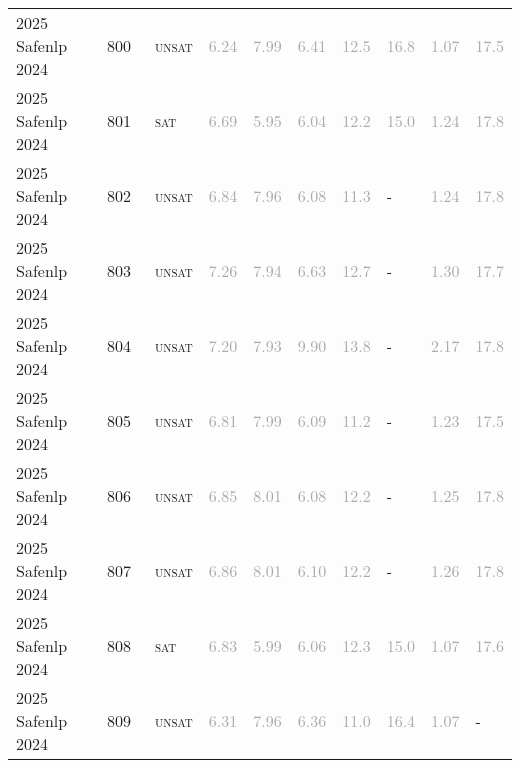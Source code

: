 \begin{center}
{\begin{longtable}{@{}llllllllll@{}}
2025 Safenlp 2024 & 800 & ~\textsc{unsat} & \textcolor{darkgray}{6.24} & \textcolor{darkgray}{7.99} & \textcolor{darkgray}{6.41} & \textcolor{darkgray}{12.5} & \textcolor{darkgray}{16.8} & \textcolor{darkgray}{1.07} & \textcolor{darkgray}{17.5} \\
2025 Safenlp 2024 & 801 & ~\textsc{sat} & \textcolor{darkgray}{6.69} & \textcolor{darkgray}{5.95} & \textcolor{darkgray}{6.04} & \textcolor{darkgray}{12.2} & \textcolor{darkgray}{15.0} & \textcolor{darkgray}{1.24} & \textcolor{darkgray}{17.8} \\
2025 Safenlp 2024 & 802 & ~\textsc{unsat} & \textcolor{darkgray}{6.84} & \textcolor{darkgray}{7.96} & \textcolor{darkgray}{6.08} & \textcolor{darkgray}{11.3} & - & \textcolor{darkgray}{1.24} & \textcolor{darkgray}{17.8} \\
2025 Safenlp 2024 & 803 & ~\textsc{unsat} & \textcolor{darkgray}{7.26} & \textcolor{darkgray}{7.94} & \textcolor{darkgray}{6.63} & \textcolor{darkgray}{12.7} & - & \textcolor{darkgray}{1.30} & \textcolor{darkgray}{17.7} \\
2025 Safenlp 2024 & 804 & ~\textsc{unsat} & \textcolor{darkgray}{7.20} & \textcolor{darkgray}{7.93} & \textcolor{darkgray}{9.90} & \textcolor{darkgray}{13.8} & - & \textcolor{darkgray}{2.17} & \textcolor{darkgray}{17.8} \\
2025 Safenlp 2024 & 805 & ~\textsc{unsat} & \textcolor{darkgray}{6.81} & \textcolor{darkgray}{7.99} & \textcolor{darkgray}{6.09} & \textcolor{darkgray}{11.2} & - & \textcolor{darkgray}{1.23} & \textcolor{darkgray}{17.5} \\
2025 Safenlp 2024 & 806 & ~\textsc{unsat} & \textcolor{darkgray}{6.85} & \textcolor{darkgray}{8.01} & \textcolor{darkgray}{6.08} & \textcolor{darkgray}{12.2} & - & \textcolor{darkgray}{1.25} & \textcolor{darkgray}{17.8} \\
2025 Safenlp 2024 & 807 & ~\textsc{unsat} & \textcolor{darkgray}{6.86} & \textcolor{darkgray}{8.01} & \textcolor{darkgray}{6.10} & \textcolor{darkgray}{12.2} & - & \textcolor{darkgray}{1.26} & \textcolor{darkgray}{17.8} \\
2025 Safenlp 2024 & 808 & ~\textsc{sat} & \textcolor{darkgray}{6.83} & \textcolor{darkgray}{5.99} & \textcolor{darkgray}{6.06} & \textcolor{darkgray}{12.3} & \textcolor{darkgray}{15.0} & \textcolor{darkgray}{1.07} & \textcolor{darkgray}{17.6} \\
2025 Safenlp 2024 & 809 & ~\textsc{unsat} & \textcolor{darkgray}{6.31} & \textcolor{darkgray}{7.96} & \textcolor{darkgray}{6.36} & \textcolor{darkgray}{11.0} & \textcolor{darkgray}{16.4} & \textcolor{darkgray}{1.07} & - \\

\end{longtable}}
\end{center}
